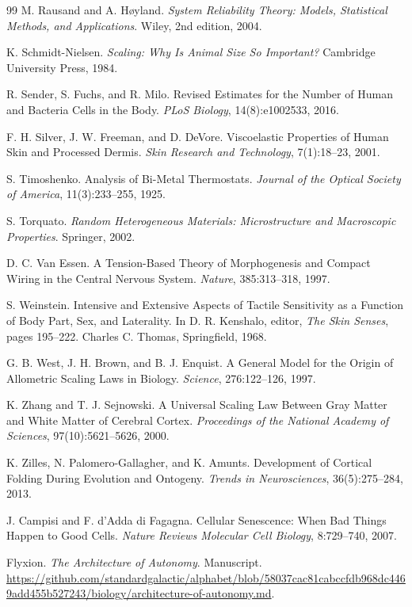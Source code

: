 \documentclass[11pt,openany]{book}
\theoremstyle{definition}
\theoremstyle{remark}
\begin{document}
\begin{thebibliography}{99}
 M. Rausand and A. H{\o}yland. \emph{System Reliability Theory: Models, Statistical Methods, and Applications}. Wiley, 2nd edition, 2004.

 K. Schmidt-Nielsen. \emph{Scaling: Why Is Animal Size So Important?} Cambridge University Press, 1984.

 R. Sender, S. Fuchs, and R. Milo. Revised Estimates for the Number of Human and Bacteria Cells in the Body. \emph{PLoS Biology}, 14(8):e1002533, 2016.

 F. H. Silver, J. W. Freeman, and D. DeVore. Viscoelastic Properties of Human Skin and Processed Dermis. \emph{Skin Research and Technology}, 7(1):18--23, 2001.

 S. Timoshenko. Analysis of Bi-Metal Thermostats. \emph{Journal of the Optical Society of America}, 11(3):233--255, 1925.

 S. Torquato. \emph{Random Heterogeneous Materials: Microstructure and Macroscopic Properties}. Springer, 2002.

 D. C. Van Essen. A Tension-Based Theory of Morphogenesis and Compact Wiring in the Central Nervous System. \emph{Nature}, 385:313--318, 1997.

 S. Weinstein. Intensive and Extensive Aspects of Tactile Sensitivity as a Function of Body Part, Sex, and Laterality. In D. R. Kenshalo, editor, \emph{The Skin Senses}, pages 195--222. Charles C. Thomas, Springfield, 1968.

 G. B. West, J. H. Brown, and B. J. Enquist. A General Model for the Origin of Allometric Scaling Laws in Biology. \emph{Science}, 276:122--126, 1997.

 K. Zhang and T. J. Sejnowski. A Universal Scaling Law Between Gray Matter and White Matter of Cerebral Cortex. \emph{Proceedings of the National Academy of Sciences}, 97(10):5621--5626, 2000.

 K. Zilles, N. Palomero-Gallagher, and K. Amunts. Development of Cortical Folding During Evolution and Ontogeny. \emph{Trends in Neurosciences}, 36(5):275--284, 2013.

 J. Campisi and F. d'Adda di Fagagna. Cellular Senescence: When Bad Things Happen to Good Cells. \emph{Nature Reviews Molecular Cell Biology}, 8:729--740, 2007.

Flyxion. \emph{The Architecture of Autonomy}. Manuscript.
\url{https://github.com/standardgalactic/alphabet/blob/58037cac81cabccfdb968dc4469add455b527243/biology/architecture-of-autonomy.md}.


\end{thebibliography}
\end{document}
